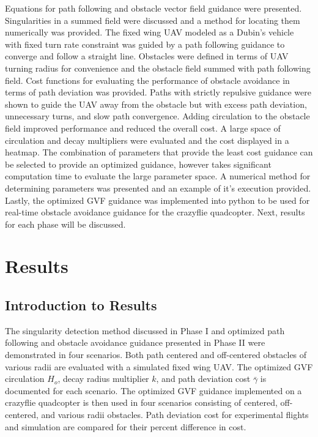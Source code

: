 \documentclass[numbered,pdftex]{ohio-etd}
\begin{document}
Equations for path following and obstacle vector field guidance were presented. Singularities in a summed field were discussed and a method for locating them numerically was provided. The fixed wing UAV modeled as a Dubin's vehicle with fixed turn rate constraint was guided by a path following guidance to converge and follow a straight line. Obstacles were defined in terms of UAV turning radius for convenience and the obstacle field summed with path following field. Cost functions for evaluating the performance of obstacle avoidance in terms of path deviation was provided. Paths with strictly repulsive guidance were shown to guide the UAV away from the obstacle but with excess path deviation, unnecessary turns, and slow path convergence. Adding circulation to the obstacle field improved performance and reduced the overall cost. A large space of circulation and decay multipliers were evaluated and the cost displayed in a heatmap. The combination of parameters that provide the least cost guidance can be selected to provide an optimized guidance, however takes significant computation time to evaluate the large parameter space. A numerical method for determining parameters was presented and an example of it's execution provided. Lastly, the optimized GVF guidance was implemented into python to be used for real-time obstacle avoidance guidance for the crazyflie quadcopter. Next, results for each phase will be discussed. 


\chapter{Results}
\section{Introduction to Results}

The singularity detection method discussed in Phase I and optimized path following and obstacle avoidance guidance presented in Phase II were demonstrated in four scenarios. Both path centered and off-centered obstacles of various radii are evaluated with a simulated fixed wing UAV. The optimized GVF circulation $H_o$, decay radius multiplier $k$, and path deviation cost $\bar{\gamma}$ is documented for each scenario. The optimized GVF guidance implemented on a crazyflie quadcopter is then used in four scenarios consisting of centered, off-centered, and various radii obstacles. Path deviation cost for experimental flights and simulation are compared for their percent difference in cost.
\end{document}

